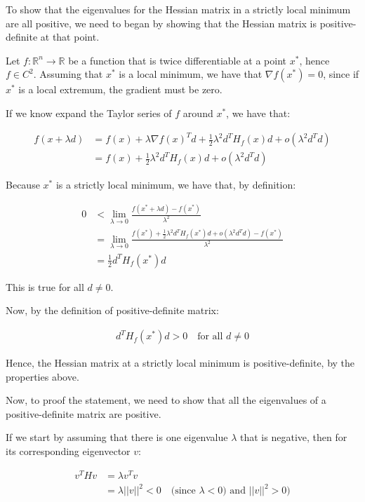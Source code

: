 \documentclass{article}
\begin{document}
To show that the eigenvalues for the Hessian matrix in a strictly local minimum are all positive, 
we need to began by showing that the Hessian matrix is positive-definite at that point.

Let $f: \mathbb{R}^n \rightarrow \mathbb{R}$ be a function that is twice differentiable at a point $x^*$, hence
$f \in C^2$. Assuming that $x^*$ is a local minimum, we have that $\nabla f(x^*) = 0$, since if $x^*$ is a local extremum,
the gradient must be zero.

If we know expand the Taylor series of $f$ around $x^*$, we have that:

\begin{align*}
    f(x + \lambda d) &= f(x) + \lambda \nabla f(x)^T d + \frac{1}{2} \lambda^2 d^T H_f(x) d + o(\lambda^2 d^T d) \\
    &= f(x) + \frac{1}{2} \lambda^2 d^T H_f(x) d + o(\lambda^2 d^T d)
\end{align*}

Because $x^*$ is a strictly local minimum, we have that, by definition:

\begin{align*}
    0 &< \lim_{\lambda \rightarrow 0} \frac{f(x^* + \lambda d) - f(x^*)}{\lambda^2} \\
    &= \lim_{\lambda \rightarrow 0} \frac{f(x^*) + \frac{1}{2} \lambda^2 d^T H_f(x^*) d + o(\lambda^2 d^T d) - f(x^*)}{\lambda^2} \\
    &= \frac{1}{2} d^T H_f(x^*) d
\end{align*}

This is true for all $d \neq 0$.

Now, by the definition of positive-definite matrix:

\begin{align*}
    d^T H_f(x^*) d > 0 \quad \text{for all $d \neq 0$}
\end{align*}

Hence, the Hessian matrix at a strictly local minimum is positive-definite, by the properties above. 

Now, to proof the statement, we need to show that all the eigenvalues of a positive-definite matrix are positive.

If we start by assuming that there is one eigenvalue $\lambda$ that is negative, then for its corresponding eigenvector $v$:

\begin{align*}
    v^T H v &= \lambda v^T v \\
    &= \lambda ||v||^2 < 0 \quad \text{(since $\lambda < 0$) and $||v||^2 > 0$)}
\end{align*}
\end{document}
